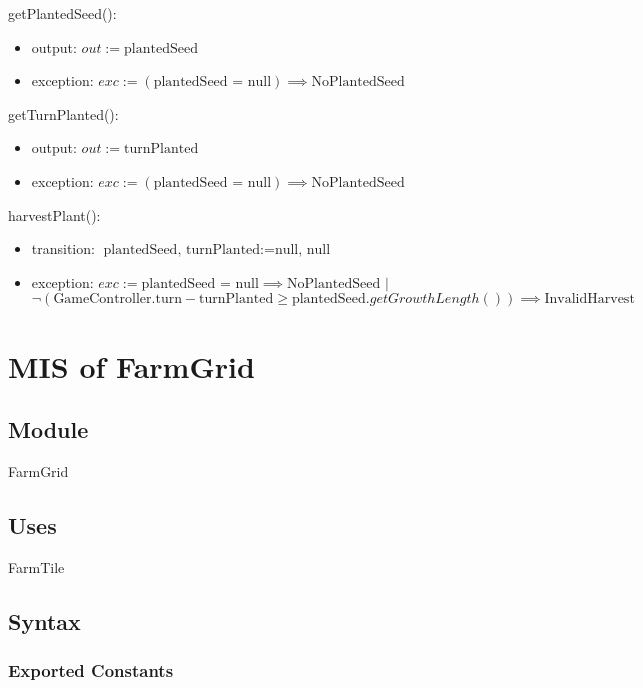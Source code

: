 \documentclass[12pt, titlepage]{article}
\begin{document}
\noindent getPlantedSeed():
\begin{itemize}
\item output: $out := \text{plantedSeed}$
\item exception: $exc := (\text{plantedSeed = null}) \implies \text{NoPlantedSeed}$
\end{itemize}

\noindent getTurnPlanted():
\begin{itemize}
\item output: $out := \text{turnPlanted}$
\item exception: $exc := (\text{plantedSeed = null}) \implies \text{NoPlantedSeed}$
\end{itemize}

\noindent harvestPlant():
\begin{itemize}
\item transition: $\text{plantedSeed, turnPlanted} := \text{null, null}$
\item exception: $exc := \text{plantedSeed = null} \implies \text{NoPlantedSeed}$ $|$ $\neg(\text{GameController.turn} - \text{turnPlanted} \ge \text{plantedSeed}.getGrowthLength()) \implies \text{InvalidHarvest}$
\end{itemize}

  
\medskip
\newpage

\section{MIS of FarmGrid} \label{FarmGrid} 

\subsection{Module}

FarmGrid

\subsection{Uses}

FarmTile

\subsection{Syntax}

\subsubsection{Exported Constants}
\end{document}

